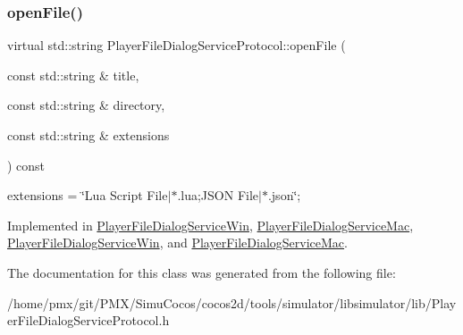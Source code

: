 \subsubsection{\texorpdfstring{open\+File()}{openFile()}\hspace{0.1cm}{\footnotesize\ttfamily [2/2]}}
{\footnotesize\ttfamily virtual std\+::string Player\+File\+Dialog\+Service\+Protocol\+::open\+File (\begin{DoxyParamCaption}\item[{const std\+::string \&}]{title,  }\item[{const std\+::string \&}]{directory,  }\item[{const std\+::string \&}]{extensions }\end{DoxyParamCaption}) const\hspace{0.3cm}{\ttfamily [pure virtual]}}

extensions = \char`\"{}\+Lua Script File$\vert$$\ast$.\+lua;\+J\+S\+O\+N File$\vert$$\ast$.\+json\char`\"{}; 

Implemented in \hyperlink{classPlayerFileDialogServiceWin_a110a061dc10c59cba4cb202316e970b4}{Player\+File\+Dialog\+Service\+Win}, \hyperlink{classPlayerFileDialogServiceMac_a79a6a3ca54cdb15fec5d0a9caeafabde}{Player\+File\+Dialog\+Service\+Mac}, \hyperlink{classPlayerFileDialogServiceWin_a1766752253a53e3b0a2c612d915b4453}{Player\+File\+Dialog\+Service\+Win}, and \hyperlink{classPlayerFileDialogServiceMac_a8752560c26dc0d249dd33ea47309a289}{Player\+File\+Dialog\+Service\+Mac}.



The documentation for this class was generated from the following file\+:\begin{DoxyCompactItemize}
\item 
/home/pmx/git/\+P\+M\+X/\+Simu\+Cocos/cocos2d/tools/simulator/libsimulator/lib/Player\+File\+Dialog\+Service\+Protocol.\+h\end{DoxyCompactItemize}
